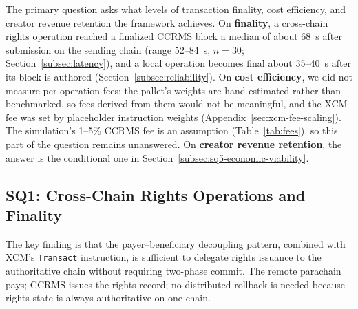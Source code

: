 The primary question asks what levels of transaction finality, cost efficiency, and creator revenue retention the framework achieves. On \textbf{finality}, a cross-chain rights operation reached a finalized CCRMS block a median of about 68~s after submission on the sending chain (range 52--84~s, $n = 30$; Section~\ref{subsec:latency}), and a local operation becomes final about 35--40~s after its block is authored (Section~\ref{subsec:reliability}). On \textbf{cost efficiency}, we did not measure per-operation fees: the pallet's weights are hand-estimated rather than benchmarked, so fees derived from them would not be meaningful, and the XCM fee was set by placeholder instruction weights (Appendix~\ref{sec:xcm-fee-scaling}). The simulation's 1--5\% CCRMS fee is an assumption (Table~\ref{tab:fees}), so this part of the question remains unanswered. On \textbf{creator revenue retention}, the answer is the conditional one in Section~\ref{subsec:sq5-economic-viability}.

\subsection{SQ1: Cross-Chain Rights Operations and Finality}\label{subsec:sq1-xcm-rights}

The key finding is that the payer--beneficiary decoupling pattern, combined with XCM's \texttt{Transact} instruction, is sufficient to delegate rights issuance to the authoritative chain without requiring two-phase commit. The remote parachain pays; CCRMS issues the rights record; no distributed rollback is needed because rights state is always authoritative on one chain.

